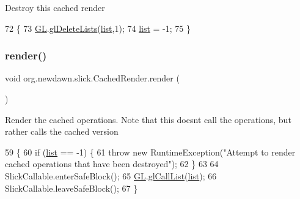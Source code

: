 Destroy this cached render 
\begin{DoxyCode}
72                           \{
73         \mbox{\hyperlink{classorg_1_1newdawn_1_1slick_1_1_cached_render_ac66ef801567b1c74e2cb8d5f47045dc4}{GL}}.\mbox{\hyperlink{interfaceorg_1_1newdawn_1_1slick_1_1opengl_1_1renderer_1_1_s_g_l_a06daf35b442a76f8d6ee62ae413fdd21}{glDeleteLists}}(\mbox{\hyperlink{classorg_1_1newdawn_1_1slick_1_1_cached_render_a0f2a2eb4568a66cd3b2c3bc6d7e6ad83}{list}},1);
74         \mbox{\hyperlink{classorg_1_1newdawn_1_1slick_1_1_cached_render_a0f2a2eb4568a66cd3b2c3bc6d7e6ad83}{list}} = -1;
75     \}
\end{DoxyCode}
\mbox{\label{classorg_1_1newdawn_1_1slick_1_1_cached_render_a9482132cdcf677dac93768e4161b5dfe}} 
\subsubsection{\texorpdfstring{render()}{render()}}
{\footnotesize\ttfamily void org.\+newdawn.\+slick.\+Cached\+Render.\+render (\begin{DoxyParamCaption}{ }\end{DoxyParamCaption})\hspace{0.3cm}{\ttfamily [inline]}}

Render the cached operations. Note that this doesn\textquotesingle{}t call the operations, but rather calls the cached version 
\begin{DoxyCode}
59                          \{
60         \textcolor{keywordflow}{if} (\mbox{\hyperlink{classorg_1_1newdawn_1_1slick_1_1_cached_render_a0f2a2eb4568a66cd3b2c3bc6d7e6ad83}{list}} == -1) \{
61             \textcolor{keywordflow}{throw} \textcolor{keyword}{new} RuntimeException(\textcolor{stringliteral}{"Attempt to render cached operations that have been destroyed"});
62         \}
63         
64         SlickCallable.enterSafeBlock();
65         \mbox{\hyperlink{classorg_1_1newdawn_1_1slick_1_1_cached_render_ac66ef801567b1c74e2cb8d5f47045dc4}{GL}}.\mbox{\hyperlink{interfaceorg_1_1newdawn_1_1slick_1_1opengl_1_1renderer_1_1_s_g_l_a8482d9603203e93027e90042db3f561a}{glCallList}}(\mbox{\hyperlink{classorg_1_1newdawn_1_1slick_1_1_cached_render_a0f2a2eb4568a66cd3b2c3bc6d7e6ad83}{list}});
66         SlickCallable.leaveSafeBlock();
67     \}
\end{DoxyCode}


